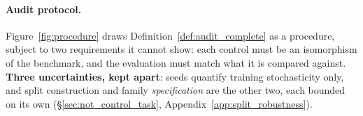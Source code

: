 \paragraph{Audit protocol.}
\label{sec:artifact}
Figure~\ref{fig:procedure} draws Definition~\ref{def:audit_complete} as a procedure, subject to two requirements it cannot show: each control must be an isomorphism of the benchmark, and the evaluation must match what it is compared against. %
\textbf{Three uncertainties, kept apart}: seeds quantify training stochasticity only, and split construction and family \emph{specification} are the other two, each bounded on its own (\S\ref{sec:not_control_task}, Appendix~\ref{app:split_robustness}).
